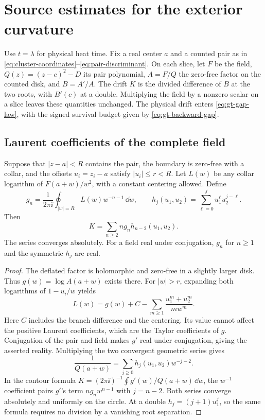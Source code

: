 \section{Source estimates for the exterior curvature}
\label{gt-source-curvature}

Use \(t=\lambda\) for physical heat time. Fix a real center \(a\) and a
counted pair as in \eqref{eq:cluster-coordinates}--\eqref{eq:pair-discriminant}.
On each slice, let \(F\) be the field, \(Q(z)=(z-c)^2-D\) its pair
polynomial, \(A=F/Q\) the zero-free factor on the counted disk, and
\(B=A'/A\). The drift \(K\) is the divided difference of \(B\) at the
two roots, with \(B'(c)\) at a double. Multiplying the field by a
nonzero scalar on a slice leaves these quantities unchanged. The
physical drift enters \eqref{eq:gt-gap-law}, with the signed survival
budget given by \eqref{eq:gt-backward-gap}.

\subsection{Laurent coefficients of the complete field}

\begin{proposition}
\label{gt-laurent-modes}
Suppose that \(|z-a|<R\) contains the pair, the boundary is zero-free
with a collar, and the offsets \(u_i=z_i-a\) satisfy \(|u_i|\le r<R\).
Let \(L(w)\) be any collar logarithm of \(F(a+w)/w^2\), with a
constant centering allowed. Define
\[
 g_n=\frac{1}{2\pi\ii}\oint_{|w|=R}L(w)w^{-n-1}\,\dd w,\qquad
 h_j(u_1,u_2)=\sum_{\ell=0}^j u_1^\ell u_2^{j-\ell}.
\]
Then
\begin{equation}
 K=\sum_{n\ge2} n g_n h_{n-2}(u_1,u_2).
 \label{gt-laurent-k}
\end{equation}
The series converges absolutely. For a field real under conjugation,
\(g_n\) for \(n\ge1\) and the symmetric \(h_j\) are real.
\end{proposition}

\begin{proof}
The deflated factor is holomorphic and zero-free in a slightly larger
disk. Thus \(g(w)=\log A(a+w)\) exists there. For \(|w|>r\), expanding
both logarithms of \(1-u_i/w\) yields
\[
 L(w)=g(w)+C-\sum_{m\ge1}\frac{u_1^m+u_2^m}{m w^m}.
\]
Here \(C\) includes the branch difference and the centering. Its value
cannot affect the positive Laurent coefficients, which are the Taylor
coefficients of \(g\). Conjugation of the pair and field makes \(g'\)
real under conjugation, giving the asserted reality. Multiplying the
two convergent geometric series gives
\[
 \frac{1}{Q(a+w)}=\sum_{j\ge0} h_j(u_1,u_2)w^{-j-2}.
\]
In the contour formula \(K=(2\pi\ii)^{-1}\oint g'(w)/Q(a+w)\,\dd w\),
the \(w^{-1}\) coefficient pairs \(g'\)'s term \(n g_n w^{n-1}\)
with \(j=n-2\). Both series converge absolutely and uniformly on
the circle. At a double \(h_j=(j+1)u_1^j\), so the same formula
requires no division by a vanishing root separation.
\end{proof}

